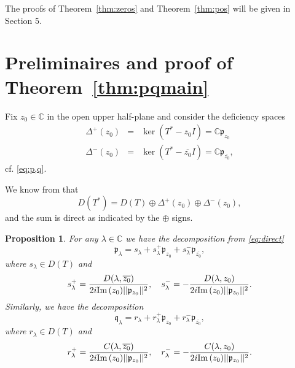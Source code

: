 \documentclass [12pt]{article}
\def\Im{{\rm Im}\,}
\newtheorem{prop}[thm]{Proposition}
\newcommand{\C}{\mathbb{C}}
\newcommand{\la}{\lambda}
\begin{document}
The proofs of Theorem~\ref{thm:zeros} and Theorem~\ref{thm:pos} will be given in Section 5.










\section{Preliminaires and proof of Theorem~\ref{thm:pqmain}} 

 Fix $z_0\in\C$ in the open upper half-plane and consider the deficiency spaces
\begin{eqnarray*}
\Delta^+(z_0) &=&\ker(T^*-z_0I)=\C \mathfrak{p}_{z_0}\\
\Delta^-(z_0) &=&\ker(T^*-\overline{z_0}I)=\C\mathfrak{p}_{\overline{z_0}},
\end{eqnarray*}
cf. \eqref{eq:p,q}.

We know from \cite[section 80]{A:G} that
\begin{equation}\label{eq:direct}
D(T^*)=D(T)\oplus \Delta^+(z_0) \oplus \Delta^-(z_0),
\end{equation} 
and the sum is direct as indicated by the $\oplus$ signs.


\begin{prop}\label{thm:pq} For any $\la\in \C$ we have the decomposition from \eqref{eq:direct} 
\begin{equation}\label{eq:p}
\mathfrak{p}_{\la}=s_\la +s_\la^+\mathfrak{p}_{z_0}+s_\la^-\mathfrak{p}_{\overline{z_0}},
\end{equation}
where $s_\la\in D(T)$ and
\begin{equation}\label{eq:s+-}
s_\la^+=\frac{D(\la,\overline{z_0})}{2i\Im(z_0)||\mathfrak{p}_{z_0}||^2},\quad 
s_\la^-=-\frac{D(\la, z_0)}{2i\Im(z_0)||\mathfrak{p}_{z_0}||^2}.
\end{equation}
Similarly, we have the decomposition
\begin{equation}\label{eq:q}
\mathfrak{q}_{\la}=r_\la +r_\la^+\mathfrak{p}_{z_0}+r_\la^-\mathfrak{p}_{\overline{z_0}},
\end{equation}
where $r_\la\in D(T)$ and
\begin{equation}\label{eq:r+-}
r_\la^+=\frac{C(\la,\overline{z_0})}{2i\Im(z_0)||\mathfrak{p}_{z_0}||^2},\quad 
r_\la^-=-\frac{C(\la, z_0)}{2i\Im(z_0)||\mathfrak{p}_{z_0}||^2}.
\end{equation}
\end{prop}
\end{document}
